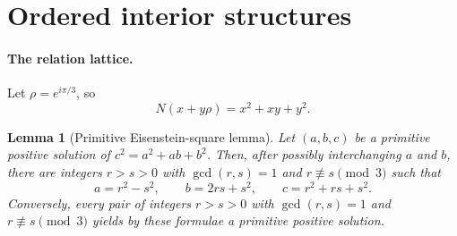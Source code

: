 \documentclass[11pt]{amsart}
\newtheorem{lemma}[theorem]{Lemma}
\theoremstyle{definition}
\theoremstyle{remark}
\begin{document}
\section{Ordered interior structures}\label{app:ordered}

\paragraph{The relation lattice.}
Let $\rho=e^{i\pi/3}$, so
\[
       N(x+y\rho)=x^2+xy+y^2.
\]
\begin{lemma}[Primitive Eisenstein-square lemma]\label{lem:eisenstein-square}
Let $(a,b,c)$ be a primitive positive solution of $c^2=a^2+ab+b^2$.  Then,
after possibly interchanging $a$ and $b$, there are integers $r>s>0$ with
$\gcd(r,s)=1$ and $r\not\equiv s\pmod3$ such that
\[
 a=r^2-s^2,\qquad b=2rs+s^2,\qquad c=r^2+rs+s^2 .
\]
Conversely, every pair of integers $r>s>0$ with $\gcd(r,s)=1$ and
$r\not\equiv s\pmod3$ yields by these formulae a primitive positive solution.
\end{lemma}
\end{document}
